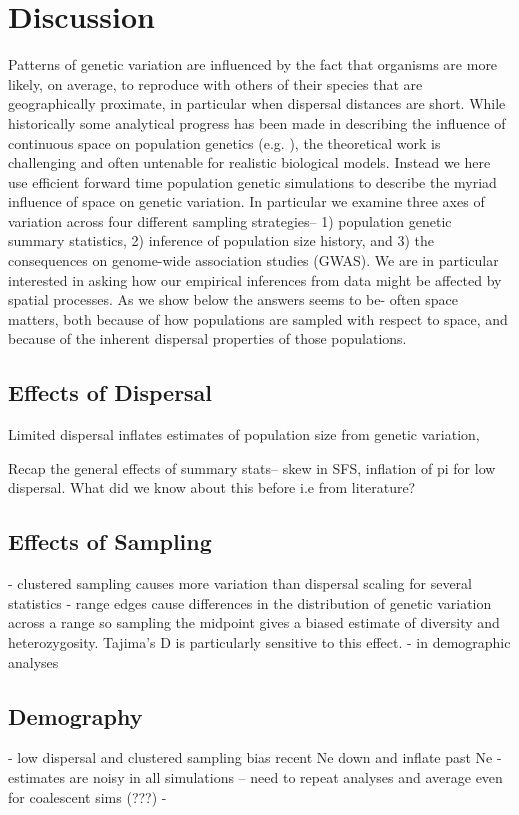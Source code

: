 \documentclass[10pt,twoside,lineno]{gsajnl}
\begin{document}
\section{Discussion}
Patterns of genetic variation are influenced by the fact that organisms are more likely, on average, to reproduce with others of their species that are geographically proximate, in particular when dispersal distances are short. While historically some analytical progress has been made in describing the influence of continuous space on population genetics (e.g. \cite{Wright1943,Rousset1997,Ringbauer2017,Barton2010}), the theoretical work is challenging and often untenable for realistic biological models. Instead we here use efficient forward time population genetic simulations to describe the myriad influence of space on genetic variation. In particular we examine three axes of variation across four different sampling strategies-- 1) population genetic summary statistics, 2) inference of population size history, and 3) the consequences on genome-wide association studies (GWAS). We are in particular interested in asking how our empirical inferences from data might be affected by spatial processes. As we show below the answers seems to be- often space matters, both because of how populations are sampled with respect to space, and because of the inherent dispersal properties of those populations. 

\subsection{Effects of Dispersal}
Limited dispersal inflates estimates of population size from genetic variation, 


Recap the general effects of summary stats-- skew in SFS, inflation of pi for low dispersal. What did we know about this before i.e from literature? 

\subsection{Effects of Sampling}

- clustered sampling causes more variation than dispersal scaling for several statistics
- range edges cause differences in the distribution of genetic variation across a range so sampling the midpoint gives a biased estimate of diversity and heterozygosity. Tajima's D is particularly sensitive to this effect. 
- in demographic analyses 

\subsection{Demography}
- low dispersal and clustered sampling bias recent Ne down and inflate past Ne
- estimates are noisy in all simulations -- need to repeat analyses and average even for coalescent sims (???)
- 
\end{document}
